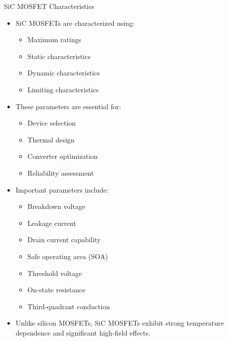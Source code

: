 \begin{frame}{SiC MOSFET Characteristics}
\begin{itemize}
    \item SiC MOSFETs are characterized using:
    \begin{itemize}
        \item Maximum ratings
        \item Static characteristics
        \item Dynamic characteristics
        \item Limiting characteristics
    \end{itemize}

    \item These parameters are essential for:
    \begin{itemize}
        \item Device selection
        \item Thermal design
        \item Converter optimization
        \item Reliability assessment
    \end{itemize}

    \item Important parameters include:
    \begin{itemize}
        \item Breakdown voltage
        \item Leakage current
        \item Drain current capability
        \item Safe operating area (SOA)
        \item Threshold voltage
        \item On-state resistance
        \item Third-quadrant conduction
    \end{itemize}

    \item Unlike silicon MOSFETs, SiC MOSFETs exhibit strong temperature dependence and significant high-field effects.
\end{itemize}
\end{frame}



